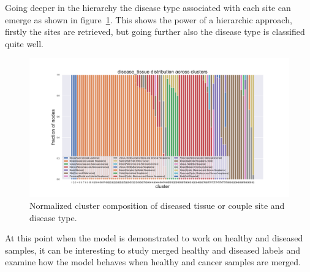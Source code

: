 Going deeper in the hierarchy the disease type associated with each site can emerge as shown in figure~\ref{fig:topic/tcga/fraction_clustercomposition_l2_disease_tissue}. This shows the power of a hierarchic approach, firstly the sites are retrieved, but going further also the disease type is classified quite well.
\begin{figure}[htb!]
	\centering
	\includegraphics[width=0.8\linewidth]{pictures/topic/tcga/fraction_clustercomposition_l2_disease_tissue.pdf}
	\caption{Normalized cluster composition of diseased tissue or couple site and disease type.}
	\label{fig:topic/tcga/fraction_clustercomposition_l2_disease_tissue}
\end{figure}
\FloatBarrier
At this point when the model is demonstrated to work on healthy and diseased samples, it can be interesting to study merged healthy and diseased labels and examine how the model behaves when healthy and cancer samples are merged.